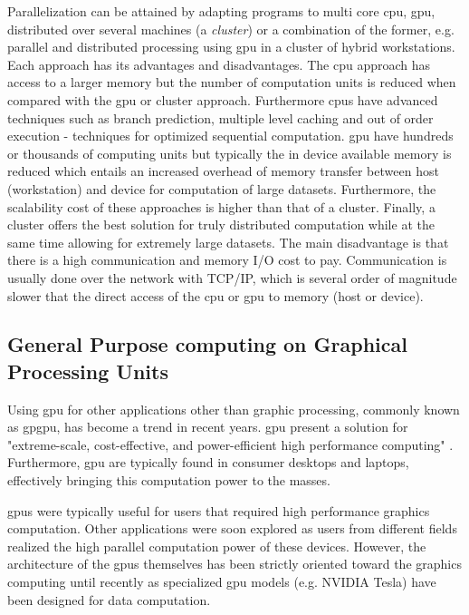 Parallelization can be attained by adapting programs to multi core \gls{cpu}, \gls{gpu}, distributed over several machines (a \emph{cluster}) or a combination of the former, e.g. parallel and distributed processing using \gls{gpu} in a cluster of hybrid workstations.
Each approach has its advantages and disadvantages.
The \gls{cpu} approach has access to a larger memory but the number of computation units is reduced when compared with the \gls{gpu} or cluster approach. Furthermore \gls{cpu}s have advanced techniques such as branch prediction, multiple level caching and out of order execution - techniques for optimized sequential computation.
\gls{gpu} have hundreds or thousands of computing units but typically the in device available memory is reduced which entails an increased overhead of memory transfer between host (workstation) and device for computation of large datasets.
Furthermore, the scalability cost of these approaches is higher than that of a cluster.
Finally, a cluster offers the best solution for truly distributed computation while at the same time allowing for extremely large datasets. The main disadvantage is that there is a high communication and memory I/O cost to pay. Communication is usually done over the network with TCP/IP, which is several order of magnitude slower that the direct access of the \gls{cpu} or \gls{gpu} to memory (host or device).



\subsection{General Purpose computing on Graphical Processing Units}
Using \gls{gpu} for other applications other than graphic processing, commonly known as \gls{gpgpu}, has become a trend in recent years. \gls{gpu} present a solution for "extreme-scale, cost-effective, and power-efficient high performance computing" \cite{Chen2012}. Furthermore, \gls{gpu} are typically found in consumer desktops and laptops, effectively bringing this computation power to the masses.

\gls{gpu}s were typically useful for users that required high performance graphics computation. Other applications were soon explored as users from different fields realized the high parallel computation power of these devices. However, the architecture of the \gls{gpu}s themselves has been strictly oriented toward the graphics computing until recently as specialized \gls{gpu} models (e.g. NVIDIA Tesla) have been designed for data computation.

